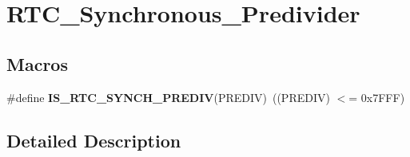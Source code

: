 \hypertarget{group___r_t_c___synchronous___predivider}{\section{R\-T\-C\-\_\-\-Synchronous\-\_\-\-Predivider}
\label{group___r_t_c___synchronous___predivider}
}
\subsection*{Macros}
\begin{DoxyCompactItemize}
\item 
\hypertarget{group___r_t_c___synchronous___predivider_ga32fccaa6ec65f9fceb3e6e4f31ab11cf}{\#define {\bfseries I\-S\-\_\-\-R\-T\-C\-\_\-\-S\-Y\-N\-C\-H\-\_\-\-P\-R\-E\-D\-I\-V}(P\-R\-E\-D\-I\-V)~((P\-R\-E\-D\-I\-V) $<$= 0x7\-F\-F\-F)}\label{group___r_t_c___synchronous___predivider_ga32fccaa6ec65f9fceb3e6e4f31ab11cf}

\end{DoxyCompactItemize}


\subsection{Detailed Description}
